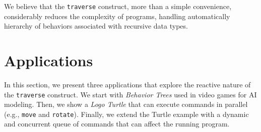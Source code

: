 \documentclass{sig-alternate}
\newcommand{\CEU}{\textsc{C\'{e}u}\xspace}
\newcommand{\code}[1] {{\small{\texttt{#1}}}}
\begin{document}
We believe that the \code{traverse} construct, more than a simple convenience, 
considerably reduces the complexity of programs, handling automatically 
hierarchy of behaviors associated with recursive data types.

\section{Applications}
\label{sec.apps}

In this section, we present three applications that explore the reactive nature 
of the \code{traverse} construct.
We start with \emph{Behavior Trees} used in video games for AI modeling.
Then, we show a \emph{Logo Turtle} that can execute commands in parallel (e.g., 
\code{move} and \code{rotate}).
Finally, we extend the Turtle example with a dynamic and concurrent queue of 
commands that can affect the running program.
\end{document}
